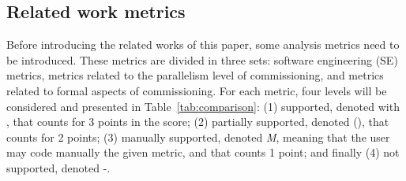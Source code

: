 
\subsection{Related work metrics}

Before introducing the related works of this paper, some analysis
metrics need to be introduced. These metrics are divided in three
sets: software engineering (SE) metrics, metrics related to the
parallelism level of commissioning, and metrics related to formal
aspects of commissioning. For each metric, four levels will be
considered and presented in Table~\ref{tab:comparison}: (1) supported,
denoted with \checkmark, that counts for 3 points in the score; (2)
partially supported, denoted (\checkmark), that counts for 2 points;
(3) manually supported, denoted \emph{M}, meaning that the user may
code manually the given metric, and that counts 1 point; and finally
(4) not supported, denoted -.

